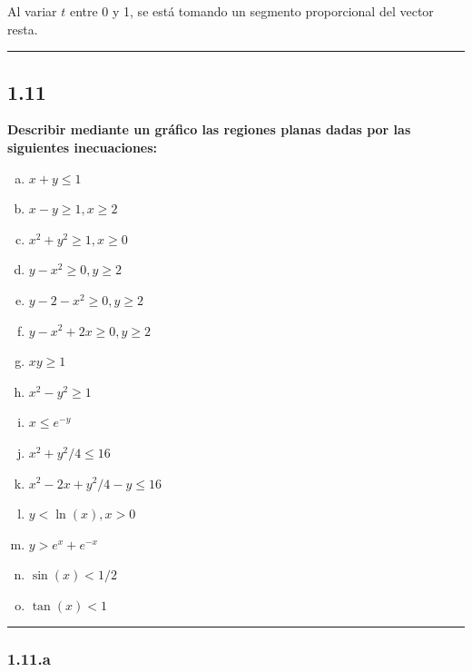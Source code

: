 \documentclass{article}
\begin{document}
Al variar $t$ entre 0 y 1, se está tomando un segmento proporcional del vector resta. 

\hrule
\vspace{10 pt}

\subsection*{1.11}
\label{subsec:1.11}

\textbf{Describir mediante un gráfico las regiones planas dadas por las siguientes inecuaciones:}

\begin{enumerate}[(a)]
\bfseries
\item $x + y \leq 1$

\item $x - y \geq 1, x \geq 2$

\item $x^2 + y^2 \geq 1, x \geq 0$

\item $y - x^2 \geq 0, y \geq 2$

\item $y - 2 - x^2 \geq 0, y \geq 2$

\item $y - x^2 + 2x \geq 0, y \geq 2$

\item $x y \geq 1$

\item $x^2 - y^2 \geq 1$

\item $x \leq e^{-y}$

\item $x^2 + y^2/4 \leq 16$

\item $x^2 - 2x + y^2/4 - y \leq 16$

\item $y < \ln(x), x > 0$

\item $y > e^x + e^{-x}$

\item $\sin(x) < 1/2$

\item $\tan(x) < 1$
\end{enumerate}
\hrule

\subsubsection*{1.11.a}
\label{subsubsec:1.11.a}
\end{document}
